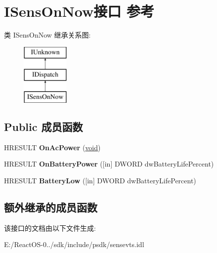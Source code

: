 \hypertarget{interface_i_sens_on_now}{}\section{I\+Sens\+On\+Now接口 参考}
\label{interface_i_sens_on_now}
类 I\+Sens\+On\+Now 继承关系图\+:\begin{figure}[H]
\begin{center}
\leavevmode
\includegraphics[height=3.000000cm]{interface_i_sens_on_now}
\end{center}
\end{figure}
\subsection*{Public 成员函数}
\begin{DoxyCompactItemize}
\item 
\mbox{\label{interface_i_sens_on_now_a0407633282b3c2ac7604256477dfa80b}} 
H\+R\+E\+S\+U\+LT {\bfseries On\+Ac\+Power} (\hyperlink{interfacevoid}{void})
\item 
\mbox{\label{interface_i_sens_on_now_a29052c35af5b4cf3aabea2ddf23c5fd5}} 
H\+R\+E\+S\+U\+LT {\bfseries On\+Battery\+Power} (\mbox{[}in\mbox{]} D\+W\+O\+RD dw\+Battery\+Life\+Percent)
\item 
\mbox{\label{interface_i_sens_on_now_a133e15296a1e7ef9eea39f0d1a5fef60}} 
H\+R\+E\+S\+U\+LT {\bfseries Battery\+Low} (\mbox{[}in\mbox{]} D\+W\+O\+RD dw\+Battery\+Life\+Percent)
\end{DoxyCompactItemize}
\subsection*{额外继承的成员函数}


该接口的文档由以下文件生成\+:\begin{DoxyCompactItemize}
\item 
E\+:/\+React\+O\+S-\/0../sdk/include/psdk/sensevts.\+idl\end{DoxyCompactItemize}

